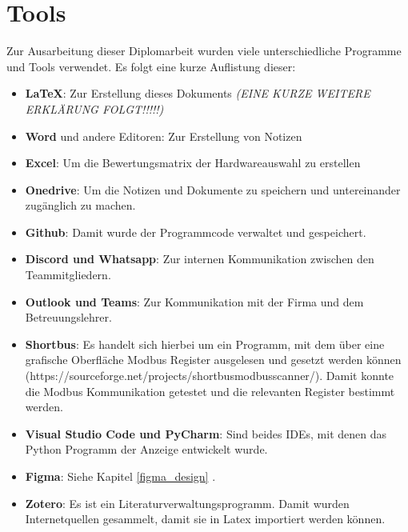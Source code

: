 \ifoot{\leftmark}
\chapter{Tools}
Zur Ausarbeitung dieser Diplomarbeit wurden viele unterschiedliche Programme und Tools verwendet. Es folgt eine kurze Auflistung dieser:
\begin{itemize}
	\item \textbf{\LaTeX}: Zur Erstellung dieses Dokuments \textit{(EINE KURZE WEITERE ERKLÄRUNG FOLGT!!!!!)}
	\item \textbf{Word} und andere Editoren: Zur Erstellung von Notizen
	\item \textbf{Excel}: Um die Bewertungsmatrix der Hardwareauswahl zu erstellen
	\item \textbf{Onedrive}: Um die Notizen und Dokumente zu speichern und untereinander zugänglich zu machen.
	\item \textbf{Github}: Damit wurde der Programmcode verwaltet und gespeichert.
	\item \textbf{Discord und Whatsapp}: Zur internen Kommunikation zwischen den Teammitgliedern.
	\item \textbf{Outlook und Teams}: Zur Kommunikation mit der Firma und dem Betreuungslehrer.
	\item \textbf{Shortbus}: Es handelt sich hierbei um ein Programm, mit dem über eine grafische Oberfläche Modbus Register ausgelesen und gesetzt werden können (https://sourceforge.net/projects/shortbusmodbusscanner/). Damit konnte die Modbus Kommunikation getestet und die relevanten Register bestimmt werden.
	\item \textbf{Visual Studio Code und PyCharm}: Sind beides IDEs, mit denen das Python Programm der Anzeige entwickelt wurde.
	\item \textbf{Figma}: Siehe Kapitel \ref{figma_design} .
	\item \textbf{Zotero}: Es ist ein Literaturverwaltungsprogramm. Damit wurden Internetquellen gesammelt, damit sie in Latex importiert werden können.
\end{itemize}
